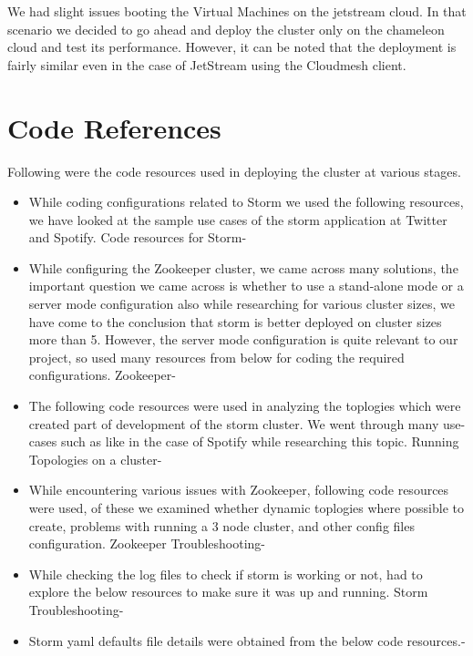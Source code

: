 \documentclass[9pt,twocolumn,twoside]{../../styles/osajnl}
\begin{document}
We had slight issues booting the Virtual Machines on the jetstream
cloud. In that scenario we decided to go ahead and deploy the cluster
only on the chameleon cloud and test its performance. However, it can
be noted that the deployment is fairly similar even in the case of
JetStream using the Cloudmesh client.

\section{Code References}
Following were the code resources used in deploying the cluster at various
stages.
\begin{itemize}
\item
  While coding configurations related to Storm we used the following
  resources, we have looked at the sample use cases of the storm
  application at Twitter and Spotify. Code resources for
  Storm-\cite{www-storm1}\cite{www-storm2}\cite{www-storm3}\cite{www-storm4}\cite{www-storm5}\cite{www-storm6}\cite{www-storm7}\cite{www-storm8}\cite{www-storm9}\cite{www-storm10}
\item
 While configuring the Zookeeper cluster, we came across many
 solutions, the important question we came across is whether to use a
 stand-alone mode or a server mode configuration also while
 researching for various cluster sizes, we have come to the conclusion
 that storm is better deployed on cluster sizes more than 5. However,
 the server mode configuration is quite relevant to our project, so
 used many resources from below for coding the required
 configurations. Zookeeper-\cite{www-zk1}\cite{www-zk2}\cite{www-zk3}\cite{www-zk4}\cite{www-zk5}\cite{www-zk6}\cite{www-zk7}\cite{www-zk8}
\item The following code resources were used in analyzing the
  toplogies which were created part of development of the storm
  cluster. We went through many use-cases such as like in the case of
  Spotify while researching this topic. Running Topologies on a
  cluster-\cite{www-rtc1}\cite{www-rtc2}\cite{www-rtc3}\cite{www-rtc4}\cite{www-rtc5}\cite{www-rtc6}
\item While encountering various issues with Zookeeper, following code
  resources were used, of these we examined whether dynamic toplogies
  where possible to create, problems with running a 3 node cluster,
  and other config files configuration. Zookeeper
  Troubleshooting-\cite{www-zt1}\cite{www-zt2}\cite{www-zt3}\cite{www-zt4}\cite{www-zt5}\cite{www-zt6}
\item While checking the log files to check if storm is working or
  not, had to explore the below resources to make sure it was up and
  running. Storm
  Troubleshooting-\cite{www-nnf1}\cite{www-nnf2}\cite{www-nnf3}\cite{www-nnf4}
\item Storm yaml defaults file details were obtained from the below
  code resources.-\cite{www-sd1}
\end{itemize}
\end{document}
